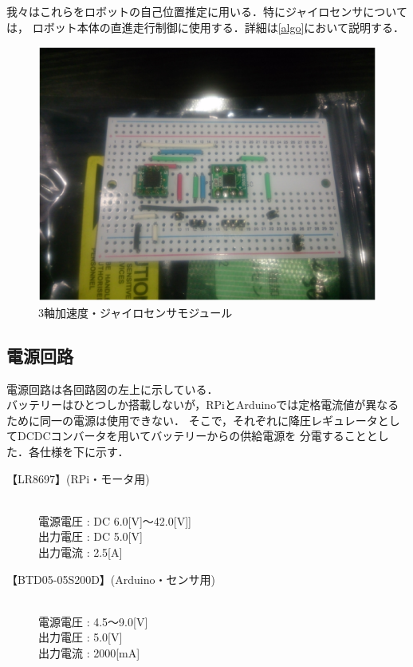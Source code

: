 我々はこれらをロボットの自己位置推定に用いる．特にジャイロセンサについては，
ロボット本体の直進走行制御に使用する．詳細は\ref{algo}において説明する．
\begin{figure}[b]
 \centering
 \includegraphics[width=0.4\hsize]{../Circuit/picture/jairo.eps}
 \caption{3軸加速度・ジャイロセンサモジュール}
    \label{jairo}
\end{figure}
\subsection{電源回路}
電源回路は各回路図の左上に示している．\\
バッテリーはひとつしか搭載しないが，RPiとArduinoでは定格電流値が異なるために同一の電源は使用できない．
そこで，それぞれに降圧レギュレータとしてDCDCコンバータを用いてバッテリーからの供給電源を
分電することとした．各仕様を下に示す．


\begin{description}
 \item[【LR8697】(RPi・モータ用)] \mbox{} \\
	    電源電圧 : DC 6.0[V]$〜$42.0[V]] \\
	    出力電圧 : DC 5.0[V] \\
	    出力電流 : 2.5[A]
 \item[【BTD05-05S200D】(Arduino・センサ用)] \mbox{} \\
	    電源電圧 : 4.5$〜$9.0[V] \\
	    出力電圧 : 5.0[V] \\
	    出力電流 : 2000[mA]
\end{description}

